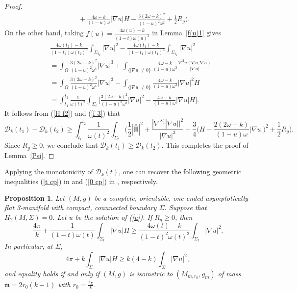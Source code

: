 \documentclass[12pt]{article}
\theoremstyle{definition}
\theoremstyle{plain}
\newtheorem{proposition}{Proposition}[section]
\numberwithin{equation}{section}
\begin{document}
\begin{proof}
\begin{equation}
\begin{aligned}
&\,\,\,\,\,\,+\frac{4\omega-k}{(1-u)\omega}|\nabla u|H-\frac{3(2\omega-k)^{2}}{(1-u)^{2}\omega^{2}}
+\frac{1}{2}R_{g}\Big).
\end{aligned}
\end{equation}
On the other hand, taking $ f(u)=\frac{4\omega(u)-k}{(1-t)\omega(u)^{3}} $ in Lemma~\ref{f(u)1} gives
\begin{equation}\label{f 3}
\begin{aligned}
&\frac{4\omega(t_{2})-k}{(1-t_{2})\omega(t_{2})^{3}}\int_{\Sigma_{t_{2}}}|\nabla u|^{2}-\frac{4\omega(t_{1})-k}{(1-t_{1})\omega(t_{1})^{3}}\int_{\Sigma_{t_{1}}}|\nabla u|^{2}\\
&=\int_{\Omega}\frac{3(2\omega-k)^{2}}{(1-u)^{2}\omega^{4}}|\nabla u|^{3}+\int_{\{|\nabla u|\neq 0\}} \frac{4\omega-k}{(1-u)\omega^{3}}\frac{\nabla^{2}u(\nabla u, \nabla u)}{|\nabla u|}\\
&=\int_{\Omega}\frac{3(2\omega-k)^{2}}{(1-u)^{2}\omega^{4}}|\nabla u|^{3}-\int_{\{|\nabla u|\neq 0\}} \frac{4\omega-k}{(1-u)\omega^{3}}|\nabla u|^{2}H\\
&=\int_{t_{1}}^{t_{2}}\frac{1}{\omega(t)^{2}}\int_{\Sigma_{t}}\Big[\frac{3(2\omega-k)^{2}}{(1-u)^{2}\omega^{2}}|\nabla u|^{2}-\frac{4\omega-k}{(1-u)\omega}|\nabla u|H\Big].
\end{aligned}
\end{equation}
It follows from (\ref{H f2}) and (\ref{f 3}) that 
\begin{equation}\label{mono Psi}
\mathcal{D}_{k}(t_{1})-\mathcal{D}_{k}(t_{2})\geq \int_{t_{1}}^{t_{2}}\frac{1}{\omega(t)^{2}}\int_{\Sigma_{t}}\Big(\frac{1}{2}|\overset{\circ}{\mathbb{II}}|^{2}+\frac{|\nabla^{\Sigma_{t}}|\nabla u||^{2}}{|\nabla u|^{2}}+\frac{3}{4}\Big(H-\frac{2(2\omega-k)}{(1-u)\omega}|\nabla u|\Big)^{2}+\frac{1}{2}R_{g}\Big).
\end{equation}
Since $ R_{g}\geq 0 $, we conclude that $ \mathcal{D}_{k}(t_{1})\geq \mathcal{D}_{k}(t_{2}) $. This completes the proof of Lemma~\ref{Psi}.
\end{proof}
Applying the monotonicity of $ \mathcal{D}_{k}(t) $, one can recover the following geometric inequalities (\ref{t cp}) in \cite{Xia} and (\ref{0 cp}) in \cite{Miao}, respectively.

\begin{proposition}\label{pro}
Let $ (M,g) $ be a complete, orientable, one-ended asymptotically flat 3-manifold with compact, connnected boundary $ \Sigma $. Suppose that $ H_{2}(M,\Sigma)=0 $. Let $ u $ be the solution of (\ref{u}). If $ R_{g}\geq 0 $, then
\begin{equation}\label{t cp}
\frac{4\pi}{k}+\frac{1}{(1-t)\omega(t)}\int_{\Sigma_{t}}|\nabla u|H\geq \frac{4\omega(t)-k}{(1-t)^{2}\omega(t)^{2}}\int_{\Sigma_{t}}|\nabla u|^{2}.
\end{equation}
In particular, at $ \Sigma $,
\begin{equation}\label{0 cp}
4\pi+k\int_{\Sigma}|\nabla u|H\geq k(4-k)\int_{\Sigma}|\nabla u|^{2},
\end{equation}
and equality holds if and only if $ (M,g) $ is isometric to $ (M_{m,r_{0}},g_{m}) $ of mass $ \mathfrak{m}=2r_{0}(k-1) $ with $ r_{0}=\frac{\mathfrak{c}_{\Sigma}}{k} $.
\end{proposition}
\end{document}
